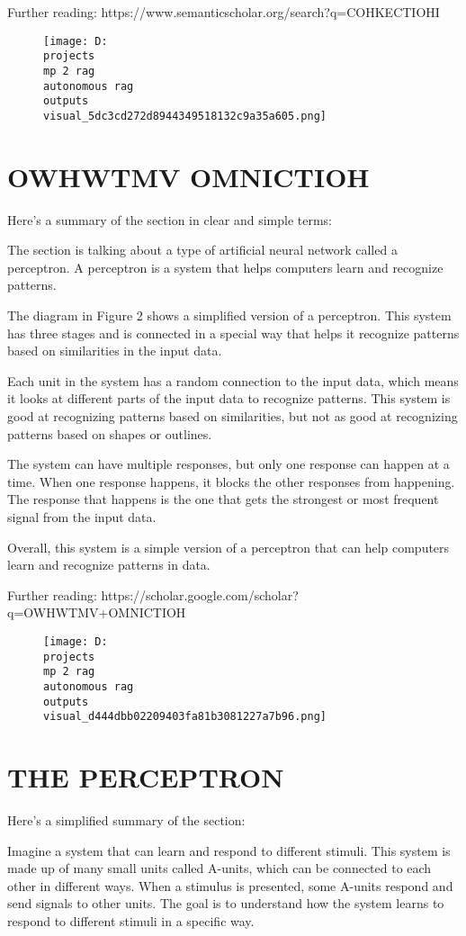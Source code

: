 \documentclass[12pt,a4paper]{article}
\begin{document}
Further reading: https://www.semanticscholar.org/search?q=COHKECTIOHI
\begin{figure}[h]
\centering
\texttt{[image: D:\\projects\\mp 2 rag\\autonomous rag\\outputs\\visual\_5dc3cd272d8944349518132c9a35a605.png]}
\end{figure}
\section{OWHWTMV OMNICTIOH}
Here's a summary of the section in clear and simple terms:

The section is talking about a type of artificial neural network called a perceptron. A perceptron is a system that helps computers learn and recognize patterns.

The diagram in Figure 2 shows a simplified version of a perceptron. This system has three stages and is connected in a special way that helps it recognize patterns based on similarities in the input data.

Each unit in the system has a random connection to the input data, which means it looks at different parts of the input data to recognize patterns. This system is good at recognizing patterns based on similarities, but not as good at recognizing patterns based on shapes or outlines.

The system can have multiple responses, but only one response can happen at a time. When one response happens, it blocks the other responses from happening. The response that happens is the one that gets the strongest or most frequent signal from the input data.

Overall, this system is a simple version of a perceptron that can help computers learn and recognize patterns in data.

Further reading: https://scholar.google.com/scholar?q=OWHWTMV+OMNICTIOH
\begin{figure}[h]
\centering
\texttt{[image: D:\\projects\\mp 2 rag\\autonomous rag\\outputs\\visual\_d444dbb02209403fa81b3081227a7b96.png]}
\end{figure}
\section{THE PERCEPTRON}
Here's a simplified summary of the section:

Imagine a system that can learn and respond to different stimuli. This system is made up of many small units called A-units, which can be connected to each other in different ways. When a stimulus is presented, some A-units respond and send signals to other units. The goal is to understand how the system learns to respond to different stimuli in a specific way.
\end{document}
